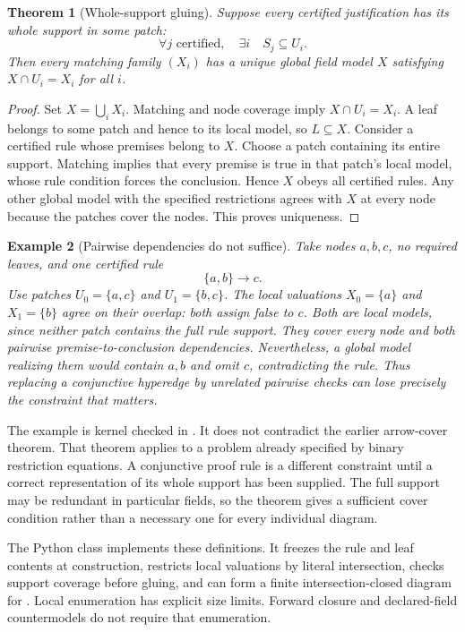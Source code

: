 \documentclass[11pt,oneside]{article}
\theoremstyle{komorebiplain}
\newtheorem{theorem}{Theorem}[section]
\theoremstyle{komorebidefinition}
\newtheorem{example}[theorem]{Example}
\theoremstyle{komorebiremark}
\begin{document}
\begin{theorem}[Whole-support gluing]
\label{res:24:3}
\label{thm:support-gluing}
Suppose every certified justification has its whole support in some patch:
\[
\forall j\text{ certified},\quad\exists i\quad S_j\subseteq U_i.
\]
Then every matching family $(X_i)$ has a unique global field model $X$ satisfying $X\cap U_i=X_i$ for all $i$.
\end{theorem}
\begin{proof}
Set $X=\bigcup_iX_i$. Matching and node coverage imply $X\cap U_i=X_i$. A leaf belongs to some patch and hence to its local model, so $L\subseteq X$. Consider a certified rule whose premises belong to $X$. Choose a patch containing its entire support. Matching implies that every premise is true in that patch's local model, whose rule condition forces the conclusion. Hence $X$ obeys all certified rules. Any other global model with the specified restrictions agrees with $X$ at every node because the patches cover the nodes. This proves uniqueness.
\end{proof}

\begin{example}[Pairwise dependencies do not suffice]
\label{res:24:4}
Take nodes $a,b,c$, no required leaves, and one certified rule
\[
\{a,b\}\longrightarrow c.
\]
Use patches $U_0=\{a,c\}$ and $U_1=\{b,c\}$. The local valuations $X_0=\{a\}$ and $X_1=\{b\}$ agree on their overlap: both assign false to $c$. Both are local models, since neither patch contains the full rule support. They cover every node and both pairwise premise-to-conclusion dependencies. Nevertheless, a global model realizing them would contain $a,b$ and omit $c$, contradicting the rule. Thus replacing a conjunctive hyperedge by unrelated pairwise checks can lose precisely the constraint that matters.
\end{example}

The example is kernel checked in . It does not contradict the earlier arrow-cover theorem. That theorem applies to a problem already specified by binary restriction equations. A conjunctive proof rule is a different constraint until a correct representation of its whole support has been supplied. The full support may be redundant in particular fields, so the theorem gives a sufficient cover condition rather than a necessary one for every individual diagram.

The Python class  implements these definitions. It freezes the rule and leaf contents at construction, restricts local valuations by literal intersection, checks support coverage before gluing, and can form a finite intersection-closed diagram for . Local enumeration has explicit size limits. Forward closure and declared-field countermodels do not require that enumeration.
\end{document}
